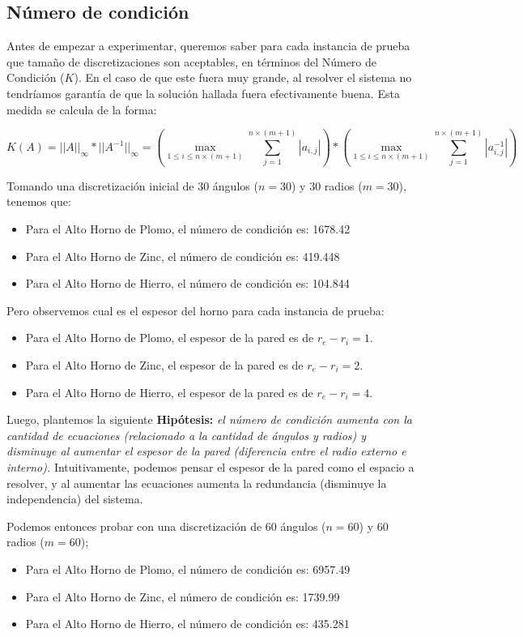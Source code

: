 \subsection{Número de condición}

Antes de empezar a experimentar, queremos saber para cada instancia de prueba que tamaño de discretizaciones son aceptables, en términos del Número de Condición ($K$).
En el caso de que este fuera muy grande, al resolver el sistema no tendríamos garantía de que la solución hallada fuera efectivamente buena. Esta medida se calcula de la forma:

$$K(A) = ||A||_{\infty} * ||A^{-1}||_{\infty} = \left( \max\limits_{1\leq i \leq n\times(m+1)}\sum_{j=1}^{n\times(m+1)}{|a_{i,j}|} \right) * \left( \max\limits_{1\leq i \leq n\times(m+1)}\sum_{j=1}^{n\times(m+1)}{|a_{i,j}^{-1}|} \right)$$

Tomando una discretización inicial de 30 ángulos ($n = 30$) y 30 radios ($m = 30$), tenemos que:
\begin{itemize}
    \item Para el Alto Horno de Plomo, el número de condición es: 1678.42
    \item Para el Alto Horno de Zinc, el número de condición es: 419.448
    \item Para el Alto Horno de Hierro, el número de condición es: 104.844
\end{itemize}

Pero observemos cual es el espesor del horno para cada instancia de prueba:
\begin{itemize}
    \item Para el Alto Horno de Plomo, el espesor de la pared es de $r_e - r_i = 1$.
    \item Para el Alto Horno de Zinc, el espesor de la pared es de $r_e - r_i = 2$.
    \item Para el Alto Horno de Hierro, el espesor de la pared es de $r_e - r_i = 4$.
\end{itemize}

Luego, plantemos la siguiente \textbf{Hipótesis:} \textit{el número de condición
aumenta con la cantidad de ecuaciones (relacionado a la cantidad de ángulos y
radios) y disminuye al aumentar el espesor de la pared (diferencia entre el
radio externo e interno).} Intuitivamente, podemos pensar el espesor de la pared
como el espacio a resolver, y al aumentar las ecuaciones aumenta la redundancia
(disminuye la independencia) del sistema.

Podemos entonces probar con una discretización de 60 ángulos ($n = 60$) y 60 radios ($m = 60$);
\begin{itemize}
    \item Para el Alto Horno de Plomo, el número de condición es: 6957.49
    \item Para el Alto Horno de Zinc, el número de condición es: 1739.99
    \item Para el Alto Horno de Hierro, el número de condición es: 435.281
\end{itemize}

